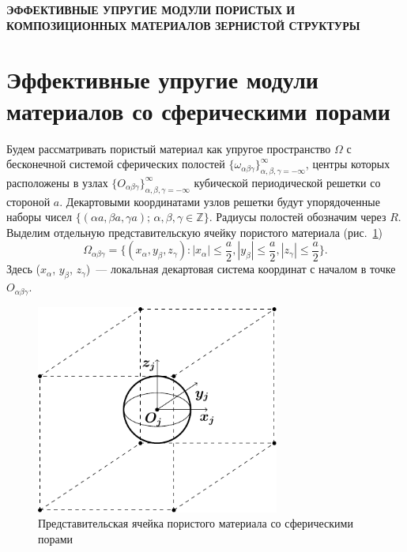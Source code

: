 
\begin{center}
{\normalsize\textbf{\centering\thechapter\; ЭФФЕКТИВНЫЕ УПРУГИЕ МОДУЛИ ПОРИСТЫХ И КОМПОЗИЦИОННЫХ МАТЕРИАЛОВ ЗЕРНИСТОЙ СТРУКТУРЫ}}\vspace{14pt} 
\end{center}



\section[Эффективные упругие модули материалов со сферическими порами]{Эффективные упругие модули материалов со сферическими порами}

Будем рассматривать пористый материал как упругое пространство $\Omega$ с бесконечной системой сферических полостей $\{\omega_{\alpha\beta\gamma}\}_{\alpha,\beta,\gamma=-\infty}^\infty$, центры которых расположены в узлах $\{O_{\alpha\beta\gamma}\}_{\alpha,\beta,\gamma=-\infty}^\infty$ кубической периодической решетки со стороной $a$. Декартовыми координатами узлов решетки будут упорядоченные наборы чисел $\{(\alpha a,\beta a,\gamma a);\,\alpha,\beta,\gamma\in\mathbb{Z}\}$. Радиусы полостей обозначим через $R$. Выделим отдельную представительскую ячейку пористого материала (рис.~\ref{f:12:1})
$$
\Omega_{\alpha\beta\gamma}=\bigg\{(x_\alpha,y_\beta,z_\gamma): |x_\alpha|\le\dfrac{a}{2},|y_\beta|\le\dfrac{a}{2},|z_\gamma|\le\dfrac{a}{2}\bigg\}.
$$
Здесь ($x_\alpha$, $y_\beta$, $z_\gamma$)~--- локальная декартовая система координат с началом в точке $O_{\alpha\beta\gamma}$.

\begin{figure}[h!]
\centering
\includegraphics[width=8cm]{cell-spheres.pdf}
\caption{Представительская ячейка пористого материала со сферическими порами}
\label{f:12:1}
\end{figure}

